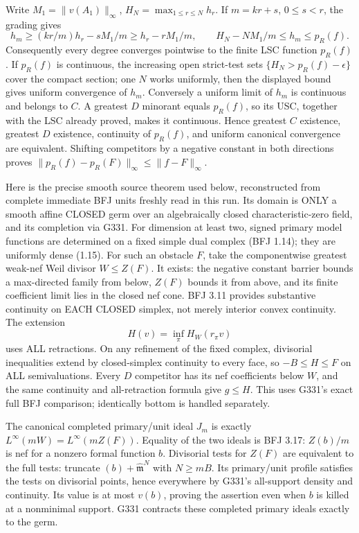Write $M_1=\|v(A_1)\|_\infty$, $H_N=\max_{1\le r\le N}h_r$.
If $m=kr+s$, $0\le s<r$, the grading gives
\[
 h_m\ge (kr/m)h_r-sM_1/m\ge h_r-rM_1/m,
 \qquad H_N-NM_1/m\le h_m\le p_R(f).
\]
Consequently every degree converges pointwise to the finite LSC function
$p_R(f)$. If $p_R(f)$ is continuous, the increasing open strict-test sets
$\{H_N>p_R(f)-\epsilon\}$ cover the compact section; one $N$ works
uniformly, then the displayed bound gives uniform convergence of $h_m$.
Conversely a uniform limit of $h_m$ is continuous and belongs to $C$.
A greatest $D$ minorant equals $p_R(f)$, so its USC, together with the
LSC already proved, makes it continuous. Hence greatest $C$ existence,
greatest $D$ existence, continuity of $p_R(f)$, and uniform canonical
convergence are equivalent. Shifting competitors by a negative constant
in both directions proves $\|p_R(f)-p_R(F)\|_\infty\le\|f-F\|_\infty$.

Here is the precise smooth source theorem used below, reconstructed from
complete immediate BFJ units freshly read in this run. Its domain is ONLY
a smooth affine CLOSED germ over an algebraically closed characteristic-zero
field, and its completion via G331. For dimension at least two, signed
primary model functions are determined on a fixed simple dual complex
(BFJ 1.14); they are uniformly dense (1.15). For such an obstacle $F$,
take the componentwise greatest weak-nef Weil divisor $W\le Z(F)$.
It exists: the negative constant barrier bounds a max-directed family from
below, $Z(F)$ bounds it from above, and its finite coefficient limit lies
in the closed nef cone. BFJ 3.11 provides substantive continuity on EACH
CLOSED simplex, not merely interior convex continuity. The extension
\[
 H(v)=\inf_{\pi} H_W(r_\pi v)
\]
uses ALL retractions. On any refinement of the fixed complex, divisorial
inequalities extend by closed-simplex continuity to every face, so
$-B\le H\le F$ on ALL semivaluations. Every $D$ competitor has its
nef coefficients below $W$, and the same continuity and all-retraction
formula give $g\le H$. This uses G331's exact full BFJ comparison;
identically bottom is handled separately.

The canonical completed primary/unit ideal $J_m$ is exactly
$L^\infty(mW)=L^\infty(mZ(F))$. Equality of the two ideals is BFJ 3.17:
$Z(b)/m$ is nef for a nonzero formal function $b$. Divisorial tests for
$Z(F)$ are equivalent to the full tests: truncate $(b)+\widehat{\mathfrak
m}^{N}$ with $N\ge mB$. Its primary/unit profile satisfies the tests on
divisorial points, hence everywhere by G331's all-support density and
continuity. Its value is at most $v(b)$, proving the assertion even when
$b$ is killed at a nonminimal support. G331 contracts these completed
primary ideals exactly to the germ.

